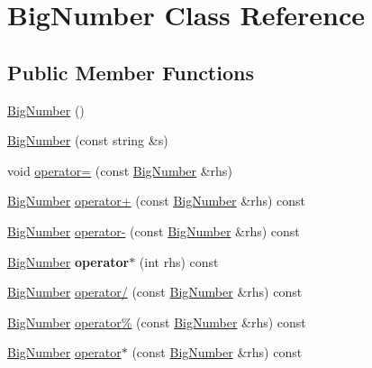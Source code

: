 \hypertarget{class_big_number}{}\section{Big\+Number Class Reference}
\label{class_big_number}
\subsection*{Public Member Functions}
\begin{DoxyCompactItemize}
\item 
\mbox{\hyperlink{class_big_number_a0d12fbec476322042ba36e61e1b0db82}{Big\+Number}} ()
\item 
\mbox{\hyperlink{class_big_number_aa7bbb37dfc485d88821306107310b8e9}{Big\+Number}} (const string \&s)
\item 
void \mbox{\hyperlink{class_big_number_a334532c27eb7e5d0ae7a2940127b499b}{operator=}} (const \mbox{\hyperlink{class_big_number}{Big\+Number}} \&rhs)
\item 
\mbox{\hyperlink{class_big_number}{Big\+Number}} \mbox{\hyperlink{class_big_number_a0e1171defb1f1673a54a09d6e8b77ed7}{operator+}} (const \mbox{\hyperlink{class_big_number}{Big\+Number}} \&rhs) const
\item 
\mbox{\hyperlink{class_big_number}{Big\+Number}} \mbox{\hyperlink{class_big_number_a263859c65a7521416b6a1bb49ba94380}{operator-\/}} (const \mbox{\hyperlink{class_big_number}{Big\+Number}} \&rhs) const
\item 
\mbox{\label{class_big_number_a8c5c0f11ad3bb8fe4f3a302cf0debc64}} 
\mbox{\hyperlink{class_big_number}{Big\+Number}} {\bfseries operator$\ast$} (int rhs) const
\item 
\mbox{\hyperlink{class_big_number}{Big\+Number}} \mbox{\hyperlink{class_big_number_a316d5af647df31aec92e0614af856957}{operator/}} (const \mbox{\hyperlink{class_big_number}{Big\+Number}} \&rhs) const
\item 
\mbox{\hyperlink{class_big_number}{Big\+Number}} \mbox{\hyperlink{class_big_number_a120df161098e0e99fdfe326beae424b8}{operator\%}} (const \mbox{\hyperlink{class_big_number}{Big\+Number}} \&rhs) const
\item 
\mbox{\hyperlink{class_big_number}{Big\+Number}} \mbox{\hyperlink{class_big_number_ac6abc5c0f90c74be947a3d489d79cb3b}{operator$\ast$}} (const \mbox{\hyperlink{class_big_number}{Big\+Number}} \&rhs) const
\end{DoxyCompactItemize}
